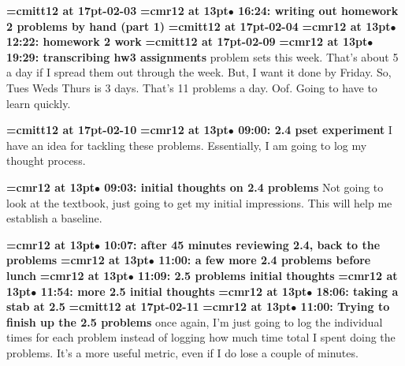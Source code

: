 {\medskip\noindent\bf\font\titlefont=cmitt12 at 17pt-02-03}\medskip
{\smallskip\noindent\bf\font\titlefont=cmr12 at 13pt\titlefont $\bullet$ 16:24: writing out homework 2 problems by hand (part 1)}\smallskip
{\medskip\noindent\bf\font\titlefont=cmitt12 at 17pt-02-04}\medskip
{\smallskip\noindent\bf\font\titlefont=cmr12 at 13pt\titlefont $\bullet$ 12:22: homework 2 work}\smallskip
{\medskip\noindent\bf\font\titlefont=cmitt12 at 17pt-02-09}\medskip
{\smallskip\noindent\bf\font\titlefont=cmr12 at 13pt\titlefont $\bullet$ 19:29: transcribing hw3 assignments} problem sets this week. That's about 5 a day if I spread them out through the week. But, I want it done by Friday. So, Tues Weds Thurs is 3 days. That's 11 problems a day. Oof. Going to have to learn quickly.
\par

{\medskip\noindent\bf\font\titlefont=cmitt12 at 17pt-02-10}\medskip
{\smallskip\noindent\bf\font\titlefont=cmr12 at 13pt\titlefont $\bullet$ 09:00: 2.4 pset experiment}\smallskip
I have an idea for tackling these problems. Essentially, I am going to log my thought process.
\par

{\smallskip\noindent\bf\font\titlefont=cmr12 at 13pt\titlefont $\bullet$ 09:03: initial thoughts on 2.4 problems}\smallskip
Not going to look at the textbook, just going to get my initial impressions. This will help me establish a baseline.
\par

{\smallskip\noindent\bf\font\titlefont=cmr12 at 13pt\titlefont $\bullet$ 10:07: after 45 minutes reviewing 2.4, back to the problems}\smallskip
{\smallskip\noindent\bf\font\titlefont=cmr12 at 13pt\titlefont $\bullet$ 11:00: a few more 2.4  problems before lunch}\smallskip
{\smallskip\noindent\bf\font\titlefont=cmr12 at 13pt\titlefont $\bullet$ 11:09: 2.5 problems initial thoughts}\smallskip
{\smallskip\noindent\bf\font\titlefont=cmr12 at 13pt\titlefont $\bullet$ 11:54: more 2.5 initial thoughts}\smallskip
{\smallskip\noindent\bf\font\titlefont=cmr12 at 13pt\titlefont $\bullet$ 18:06: taking a stab at 2.5}\smallskip
{\medskip\noindent\bf\font\titlefont=cmitt12 at 17pt-02-11}\medskip
{\smallskip\noindent\bf\font\titlefont=cmr12 at 13pt\titlefont $\bullet$ 11:00: Trying to finish up the 2.5 problems}\smallskip
once again, I'm just going to log the individual times for each problem instead of logging how much time total I spent doing the problems. It's a more useful metric, even if I do lose a couple of minutes.
\par

